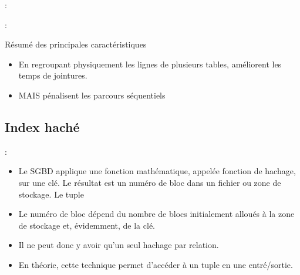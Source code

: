 \documentclass[10pt]{beamer}
\begin{document}
\begin{frame}{\secname : \subsecname}
    
\end{frame}

\begin{frame}{\secname : \subsecname}
    \begin{alertblock}{Résumé des principales caractéristiques}
        \begin{itemize}
            \item En regroupant physiquement les lignes de plusieurs tables, améliorent les temps de jointures.
            \item MAIS pénalisent les parcours séquentiels
        \end{itemize}
    \end{alertblock}
\end{frame}

\subsection{Index haché}
\begin{frame}{\secname : \subsecname}
    \begin{itemize}
        \item Le SGBD applique une fonction mathématique, appelée fonction de hachage, sur une clé.  Le résultat est un numéro de bloc dans un fichier ou zone de stockage. Le tuple
        \item Le numéro de bloc dépend du nombre de blocs initialement alloués à la zone de stockage et, évidemment, de la clé.
        \item Il ne peut donc y avoir qu'un seul hachage par relation.
        \item En théorie, cette technique permet d'accéder à un tuple en une entré/sortie.
    \end{itemize}
\end{frame}
\end{document}
